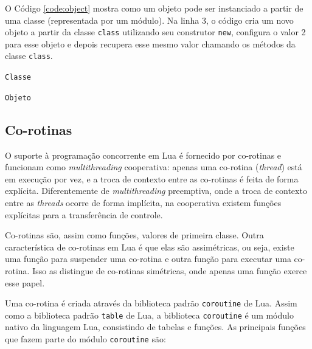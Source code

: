 O Código \ref{code:object} mostra como um objeto pode ser instanciado a partir de uma classe (representada por um módulo). Na linha 3, o código cria um novo objeto a partir da classe \verb|class| utilizando seu construtor \verb|new|, configura o valor 2 para esse objeto e depois recupera esse mesmo valor chamando os métodos da classe \verb|class|.

\begin{center}
 \begin{minipage}{0.7\textwidth}
  \begin{codigo}[H]
   \small
   \caption{\texttt{Classe}}
   \label{code:class}
  \end{codigo}
 \end{minipage}
\end{center}

\begin{center}
 \begin{minipage}{0.7\textwidth}
  \begin{codigo}[H]
   \small
   \caption{\texttt{Objeto}}
   \label{code:object}
  \end{codigo}
 \end{minipage}
\end{center}

\subsection{Co-rotinas}
\label{subsec:coroutines}

O suporte à programação concorrente em Lua é fornecido por co-rotinas e funcionam como {\em multithreading} cooperativa: apenas uma co-rotina ({\em thread}) está em execução por vez, e a troca de contexto entre as co-rotinas é feita de forma explícita. Diferentemente de {\em multithreading} preemptiva, onde a troca de contexto entre as {\em threads} ocorre de forma implícita, na cooperativa existem funções explícitas para a transferência de controle.

Co-rotinas são, assim como funções, valores de primeira classe. Outra característica de co-rotinas em Lua é que elas são assimétricas, ou seja, existe uma função para suspender uma co-rotina e outra função para executar uma co-rotina. Isso as distingue de co-rotinas simétricas, onde apenas uma função exerce esse papel.

Uma co-rotina é criada através da biblioteca padrão \verb|coroutine| de Lua. Assim como a biblioteca padrão \verb|table| de Lua, a biblioteca \verb|coroutine| é um módulo nativo da linguagem Lua, consistindo de tabelas e funções. As principais funções que fazem parte do módulo \verb|coroutine| são:

